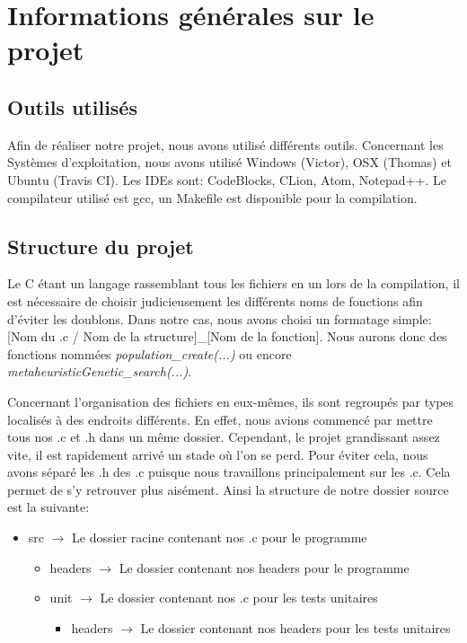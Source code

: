 \documentclass{EPUProjetPeiP}
\begin{document}
\chapter{Informations générales sur le projet}
\section{Outils utilisés}
Afin de réaliser notre projet, nous avons utilisé différents outils. Concernant les Systèmes d'exploitation, nous avons utilisé Windows (Victor), OSX (Thomas) et Ubuntu (Travis CI). Les IDEs sont: CodeBlocks, CLion, Atom, Notepad++. Le compilateur utilisé est gcc, un Makefile est disponible pour la compilation.

\section{Structure du projet}
Le C étant un langage rassemblant tous les fichiers en un lors de la compilation, il est nécessaire de choisir judicieusement les différents noms de fonctions afin d'éviter les doublons. Dans notre cas, nous avons choisi un formatage simple: [Nom du .c / Nom de la structure]\_[Nom de la fonction]. Nous aurons donc des fonctions nommées \textit{population\_create(...)} ou encore \textit{metaheuristicGenetic\_search(...)}.

Concernant l'organisation des fichiers en eux-mêmes, ils sont regroupés par types localisés à des endroits différents. En effet, nous avions commencé par mettre tous nos .c et .h dans un même dossier. Cependant, le projet grandissant assez vite, il est rapidement arrivé un stade où l'on se perd. Pour éviter cela, nous avons séparé les .h des .c puisque nous travaillons principalement sur les .c. Cela permet de s'y retrouver plus aisément. Ainsi la structure de notre dossier source est la suivante:
\begin{itemize}
	\item src $\longrightarrow$ Le dossier racine contenant nos .c pour le programme
	\begin{itemize}
		\item headers $\longrightarrow$ Le dossier contenant nos headers pour le programme
		\item unit $\longrightarrow$ Le dossier contenant nos .c pour les tests unitaires
		\begin{itemize}
			\item headers $\longrightarrow$ Le dossier contenant nos headers pour les tests unitaires\\
		\end{itemize}	
	\end{itemize}
\end{itemize}
\end{document}
